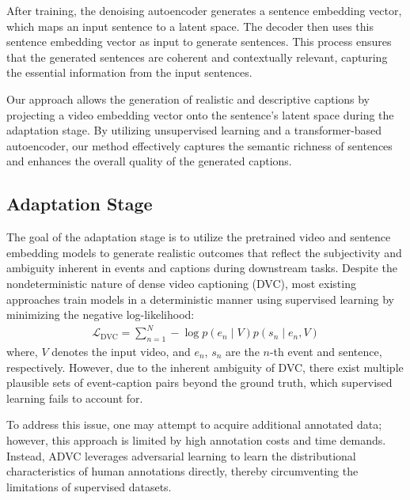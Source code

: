 After training, the denoising autoencoder generates a sentence embedding vector, which maps an input sentence to a latent space.
The decoder then uses this sentence embedding vector as input to generate sentences.
This process ensures that the generated sentences are coherent and contextually relevant, capturing the essential information from the input sentences.

Our approach allows the generation of realistic and descriptive captions by projecting a video embedding vector onto the sentence's latent space during the adaptation stage.
By utilizing unsupervised learning and a transformer-based autoencoder, our method effectively captures the semantic richness of sentences and enhances the overall quality of the generated captions.

\subsection{Adaptation Stage}
\label{subsec:adaptation}
The goal of the adaptation stage is to utilize the pretrained video and sentence embedding models to generate realistic outcomes that reflect the subjectivity and ambiguity inherent in events and captions during downstream tasks. 
Despite the nondeterministic nature of dense video captioning (DVC), most existing approaches train models in a deterministic manner using supervised learning by minimizing the negative log-likelihood:
\begin{equation}
    \begin{aligned}
        \mathcal{L}_{\text{DVC}} =\sum_{n=1}^N-\log p\left(e_n \mid V\right) p\left(s_n \mid e_n, V\right)
    \end{aligned}
\end{equation}
where, $V$ denotes the input video, and $e_n$, $s_n$ are the $n$-th event and sentence, respectively. 
However, due to the inherent ambiguity of DVC, there exist multiple plausible sets of event-caption pairs beyond the ground truth, which supervised learning fails to account for.

To address this issue, one may attempt to acquire additional annotated data; however, this approach is limited by high annotation costs and time demands. 
Instead, ADVC leverages adversarial learning to learn the distributional characteristics of human annotations directly, thereby circumventing the limitations of supervised datasets.

